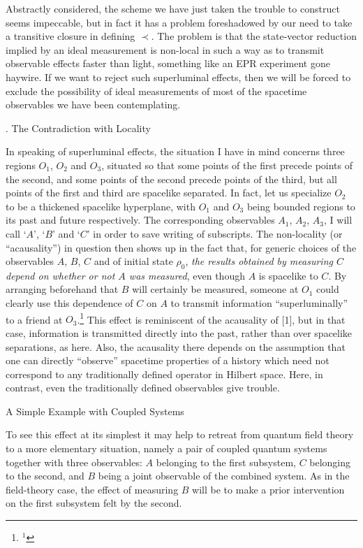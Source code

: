 \tx
Abstractly considered, the scheme we have just taken the trouble to
construct seems impeccable, but in fact it has a problem foreshadowed
by our need to take a transitive closure in defining $\prec$.  The
problem is that the state-vector reduction implied by an ideal
measurement is non-local in such a way as to transmit observable
effects faster than light, something like an EPR experiment gone
haywire.  If we want to reject such superluminal effects, then we will
be forced to exclude the possibility of ideal measurements of most of
the spacetime observables we have been contemplating.


. The Contradiction with Locality\par

\tx
In speaking of superluminal effects, the situation I have in mind
concerns three regions $O_1$, $O_2$ and $O_3$, situated so that some
points of the first precede points of the second, and some points of
the second precede points of the third, but all points of the first
and third are spacelike separated.  In fact, let us specialize $O_2$
to be a thickened spacelike hyperplane, with $O_1$ and $O_3$ being
bounded regions to its past and future respectively.  The
corresponding observables $A_1$, $A_2$, $A_3$, I will call `$A$',
`$B$' and `$C$' in order to save writing of subscripts.  The
non-locality (or ``acausality'') in question then shows up in the fact
that, for generic choices of the observables $A$, $B$, $C$ and of
initial state $\rho_0$, {\it the results obtained by measuring $C$
depend on whether or not $A$ was measured}, even though $A$ is
spacelike to $C$.  By arranging beforehand that $B$ will certainly be
measured, someone at $O_1$ could clearly use this dependence of $C$ on
$A$ to transmit information ``superluminally'' to a friend at
$O_3$.\footnote{$^1$}
%
{This effect is reminiscent of the acausality of [1], but
in that case, information is transmitted directly into the past,
rather than over spacelike separations, as here.  Also, the acausality
there depends on the assumption that one can directly ``observe''
spacetime properties of a history which need not correspond to any
traditionally defined operator in Hilbert space.  Here, in contrast,
even the traditionally defined observables give trouble.}


\hb A Simple Example with Coupled Systems \par

\tx
To see this effect at its simplest it may help to retreat from quantum
field theory to a more elementary situation, namely a pair of coupled
quantum systems together with three observables: $A$ belonging to the
first subsystem, $C$ belonging to the second, and $B$ being a joint
observable of the combined system.  As in the field-theory case, the
effect of measuring $B$ will be to make a prior intervention on the
first subsystem felt by the second.

